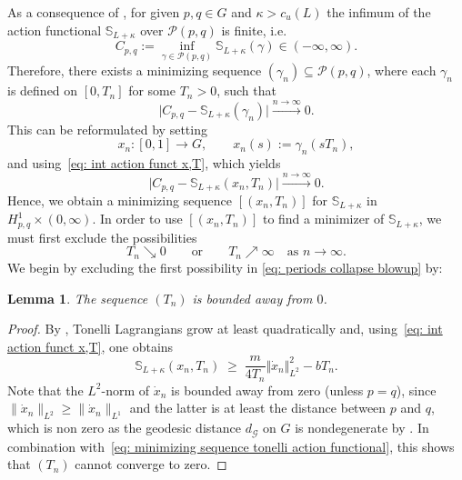 \documentclass[11pt,reqno]{amsart}
\theoremstyle{plain}
\newtheorem{lem}[thm]{Lemma}
\theoremstyle{definition}
\theoremstyle{plain} %
\newtheorem{lem}[lem]{Lemma}
\theoremstyle{definition} %
\numberwithin{equation}{section}
\def\G{\mathcal{G}}
\def\SS{{\mathbb{S}}}
\begin{document}
As a consequence of , 
for given $p,q \in G$ and $\kappa > c_u(L)$ the infimum of the action functional $\mathbb S_{L+\kappa}$ 
over $\mathcal{P}(p,q)$ is finite, i.e.
\begin{equation}\label{eq: definition inf of Slk}
    C_{p,q} := \inf_{\gamma \in \mathcal{P}(p,q)} \SS_{L+\kappa}(\gamma) \in (-\infty, \infty).   
\end{equation}
Therefore, there exists a minimizing sequence $(\gamma_n) \subseteq \mathcal{P}(p,q)$, 
where each $\gamma_n$ is defined on \( [0, T_n] \) for some \( T_n > 0 \), such that
\[
    \bigl| C_{p,q} - \SS_{L+\kappa}(\gamma_n) \bigr| \xrightarrow{n \to \infty} 0.
\] 
This can be reformulated by setting  
\[
    x_n \colon [0, 1] \to G, 
    \qquad 
    x_n(s) := \gamma_n(sT_n),
\]  
and using~\eqref{eq: int action funct x,T}, which yields
\begin{equation}\label{eq: minimizing sequence tonelli action functional}
    \bigl| C_{p,q} -\SS_{L+\kappa}(x_n,T_n) \bigr| \xrightarrow{n \to \infty}0.
\end{equation}
Hence, we obtain a minimizing sequence $[(x_n,T_n)]$ for $\mathbb S_{L+\kappa}$ in \( H^1_{p, q} \times (0, \infty) \). In order to use $[(x_n,T_n)]$ to find a minimizer of \( \mathbb S_{L+\kappa} \), we must first exclude the possibilities
\begin{equation}\label{eq: periods collapse blowup}
    T_n \searrow 0 
    \qquad \text{or} \qquad 
    T_n \nearrow \infty 
    \quad \text{as } n \to \infty .
\end{equation}
We begin by excluding the first possibility in \eqref{eq: periods collapse blowup} by:
\begin{lem}\label{Lem: Tn bounded away from zero}
        The sequence \( (T_n) \) is bounded away from \( 0 \).
\end{lem}
\begin{proof}
     By , Tonelli Lagrangians grow at least quadratically and, using~\eqref{eq: int action funct x,T}, one obtains
    \[
       \SS_{L+\kappa}(x_n,T_n)\;\geq\; 
        \frac{m}{4T_n} \Vert \dot{x}_n \Vert^2_{L^2} - b T_n .
    \]
    Note that the \( L^2 \)-norm of \( \dot{x}_n \) is bounded away from zero (unless \( p = q \)), since \( \| \dot x_n \|_{L^2} \geq \| \dot x_n \|_{L^1} \) and the latter is at least the distance between \( p \) and \( q \), which is non zero as the geodesic distance $d_\G$ on $G$ is nondegenerate by \cite[Thm.\ 7.3]{Bauer_2025}.
    In combination with~\eqref{eq: minimizing sequence tonelli action functional}, 
this shows that $(T_n)$ cannot converge to zero.   
\end{proof}
\end{document}
